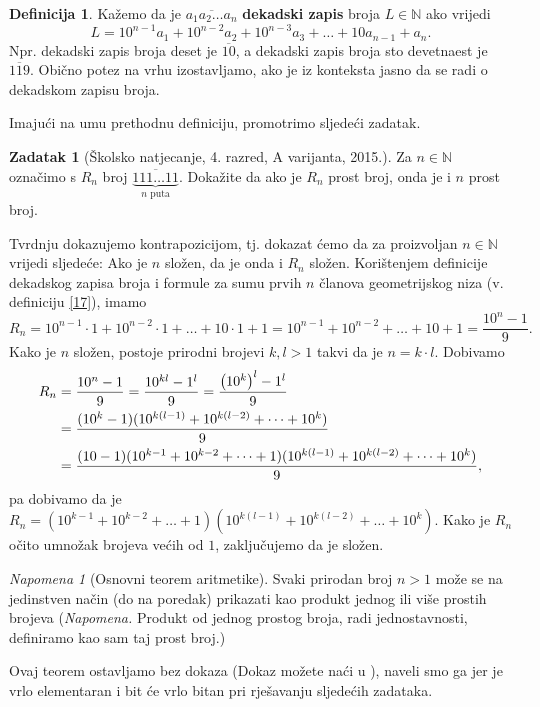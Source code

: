 \documentclass{book}
\let\originalleft\left
\let\originalright\right
\renewcommand{\left}{\mathopen{}\mathclose\bgroup\originalleft}
\renewcommand{\right}{\aftergroup\egroup\originalright}
\renewenvironment{proof}{%
    \vspace{-\parskip}\begin{oldproof}%
    }{%
    \end{oldproof}%
}
\theoremstyle{definition}
\theoremstyle{definition}
\newtheorem{definition}{Definicija}
\newtheorem{exercise}{Zadatak}
\theoremstyle{remark}
\newtheorem{remark}{Napomena}
\begin{document}
\begin{definition}
Kažemo da je $\overline{a_1a_2\dots a_n}$ \textbf{dekadski zapis} broja $L\in \mathbb{N}$ ako vrijedi
$$L=10^{n-1}a_1+10^{n-2}a_2+10^{n-3}a_3+\dots+10a_{n-1}+a_n.$$
Npr. dekadski zapis broja deset je $\overline{10}$, a dekadski zapis broja sto devetnaest je $\overline{119}$. Obično potez na vrhu izostavljamo, ako je iz konteksta jasno da se radi o dekadskom zapisu broja.
\end{definition}

\noindent Imajući na umu prethodnu definiciju, promotrimo sljedeći zadatak.
\begin{exercise}[Školsko natjecanje, 4. razred, A varijanta, 2015.]
Za $n\in \mathbb{N}$ označimo s $R_n$ broj $\underbrace{\overline{111\dots 11}}_\text{$n$ puta}$. Dokažite da ako je $R_n$ prost broj, onda je i $n$ prost broj.
\end{exercise}
\begin{proof}[Rješenje]
Tvrdnju dokazujemo kontrapozicijom, tj. dokazat ćemo da za proizvoljan $n\in \mathbb{N}$ vrijedi sljedeće: Ako je $n$ složen, da je onda i $R_n$ složen. Korištenjem definicije dekadskog zapisa broja i formule za sumu prvih $n$ članova geometrijskog niza (v. definiciju \ref{17}), imamo
$$R_n=10^{n-1}\cdot 1+10^{n-2}\cdot 1+\dots+10\cdot 1+1=10^{n-1}+10^{n-2}+\dots+10+1=\dfrac{10^n-1}{9}.$$
Kako je $n$ složen, postoje prirodni brojevi $k, l>1$ takvi da je $n=k\cdot l$. Dobivamo
\begin{align*}
R_n&=\dfrac{10^n-1}{9}=\dfrac{10^{kl}-1^l}{9}=\dfrac{\left(10^{k}\right)^l-1^l}{9}\\
&=\dfrac{(10^k-1)(10^{k(l-1)}+10^{k(l-2)}+\dots+10^k)}{9}\\
&=\dfrac{(10-1)(10^{k-1}+10^{k-2}+\dots+1)(10^{k(l-1)}+10^{k(l-2)}+\dots+10^k)}{9},
\end{align*}
pa dobivamo da je $R_n=(10^{k-1}+10^{k-2}+\dots+1)(10^{k(l-1)}+10^{k(l-2)}+\dots+10^k)$. Kako je $R_n$ očito umnožak brojeva većih od $1$, zaključujemo da je složen.
\end{proof}
\begin{remark}[Osnovni teorem aritmetike]
Svaki prirodan broj $n>1$ može se na jedinstven način (do na poredak) prikazati kao produkt jednog ili više prostih brojeva (\textit{Napomena.} Produkt od jednog prostog broja, radi jednostavnosti, definiramo kao sam taj prost broj.)
\end{remark}
Ovaj teorem ostavljamo bez dokaza (Dokaz možete naći u \cite{4}), naveli smo ga jer je vrlo elementaran i bit će vrlo bitan pri rješavanju sljedećih zadataka.
\end{document}
